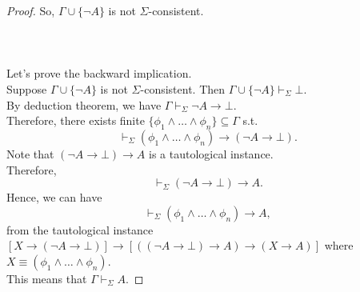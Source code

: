 \documentclass[12pt]{article}
\newcommand{\dr}{\vdash_{\Sigma}}
\begin{document}
\begin{proof}
    So, $\Gamma \cup \{\neg A\}$ is not $\Sigma$-consistent.\\
    \\
    \\
    \\
    Let's prove the backward implication.\\
    Suppose $\Gamma \cup \{\neg A\}$ is not $\Sigma$-consistent.
    Then $\Gamma \cup \{\neg A\} \dr \bot$.\\
    By deduction theorem, we have $\Gamma \dr \neg A \to \bot$.\\
    Therefore, there exists finite $\{\phi_1 \land \dots \land \phi_n\} \subseteq \Gamma$ s.t.
    $$\dr (\phi_1 \land \dots \land \phi_n) \to (\neg A \to \bot).$$
    Note that $(\neg A \to \bot) \to A$ is a tautological instance.\\
    Therefore,
    $$\dr (\neg A \to \bot) \to A.$$
    Hence, we can have
    $$\dr (\phi_1 \land \dots \land \phi_n) \to A,$$
    from the tautological instance $[X \to (\neg A \to \bot)] \to [((\neg A \to \bot) \to A) \to (X \to A)]$ where $X \equiv (\phi_1 \land \dots \land \phi_n)$.\\
    This means that $\Gamma \dr A$.
    

\end{proof}
\end{document}
